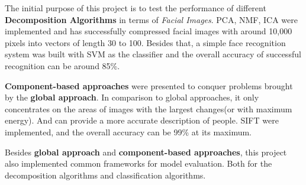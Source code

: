 \begin{englishabstract}

The initial purpose of this project is to test the performance of different \textbf{Decomposition Algorithms} in terms of \textit{Facial Images}. PCA, NMF, ICA were implemented and has successfully compressed facial images with around 10,000 pixels into vectors of length 30 to 100. Besides that, a simple face recognition system was built with SVM as the classifier and the overall accuracy of successful recognition can be around 85\%. \newline

\textbf{Component-based approaches} were presented to conquer problems brought by the \textbf{global approach}. In comparison to global 
approaches, it only concentrates on the areas of images with the largest changes(or with maximum energy). And can provide a more accurate description of people. SIFT were implemented, and the overall accuracy can be 99\% at its maximum. \newline

Besides \textbf{global approach} and \textbf{component-based approaches}, this project also implemented  common frameworks for model evaluation. Both for the decomposition algorithms and classification algorithms.


\end{englishabstract}
